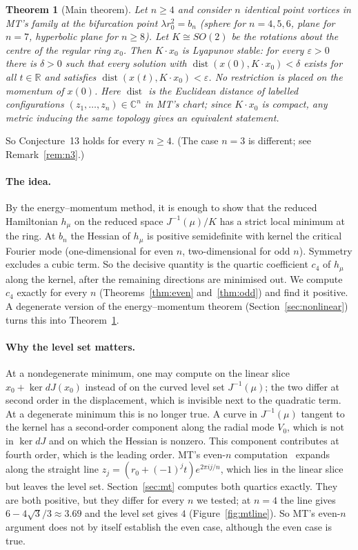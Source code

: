 \documentclass[11pt]{article}
\numberwithin{equation}{section}
\newtheorem{theorem}{Theorem}[section]
\theoremstyle{definition}
\theoremstyle{remark}
\newcommand{\R}{\mathbb{R}}
\newcommand{\C}{\mathbb{C}}
\begin{document}
\begin{theorem}[Main theorem]\label{thm:main}
Let $n\ge4$ and consider $n$ identical point vortices in MT's family at the bifurcation point
$\lambda r_0^2=b_n$ (sphere for $n=4,5,6$, plane for $n=7$, hyperbolic plane for $n\ge8$). Let $K\cong
SO(2)$ be the rotations about the centre of the regular ring $x_0$. Then $K\cdot x_0$ is Lyapunov stable:
for every $\varepsilon>0$ there is $\delta>0$ such that every solution with
$\operatorname{dist}(x(0),K\cdot x_0)<\delta$ exists for all $t\in\R$ and satisfies
$\operatorname{dist}(x(t),K\cdot x_0)<\varepsilon$. No restriction is placed on the momentum of $x(0)$.
Here $\operatorname{dist}$ is the Euclidean distance of labelled configurations $(z_1,\dots,z_n)\in\C^n$ in MT's
chart; since $K\cdot x_0$ is compact, any metric inducing the same topology gives an equivalent statement.
\end{theorem}

\noindent So Conjecture~13 holds for every $n\ge4$. (The case $n=3$ is different; see
Remark~\ref{rem:n3}.)

\paragraph{The idea.} By the energy--momentum method, it is enough to show that the reduced Hamiltonian
$h_\mu$ on the reduced space $J^{-1}(\mu)/K$ has a strict local minimum at the ring. At $b_n$ the Hessian
of $h_\mu$ is positive semidefinite with kernel the critical Fourier mode (one-dimensional for even $n$,
two-dimensional for odd $n$). Symmetry excludes a cubic term. So the decisive quantity is the quartic
coefficient $c_4$ of $h_\mu$ along the kernel, after the remaining directions are minimised out. We
compute $c_4$ exactly for every $n$ (Theorems~\ref{thm:even} and~\ref{thm:odd}) and find it positive. A
degenerate version of the energy--momentum theorem (Section~\ref{sec:nonlinear}) turns this into
Theorem~\ref{thm:main}.

\paragraph{Why the level set matters.} At a nondegenerate minimum, one may compute on the linear slice
$x_0+\ker dJ(x_0)$ instead of on the curved level set $J^{-1}(\mu)$; the two differ at second order in the
displacement, which is invisible next to the quadratic term. At a degenerate minimum this is no longer
true. A curve in $J^{-1}(\mu)$ tangent to the kernel has a second-order component along the radial mode
$V_0$, which is not in $\ker dJ$ and on which the Hessian is nonzero. This component contributes at fourth
order, which is the leading order. MT's even-$n$ computation~\cite[\S3.5.1]{MT} expands along the straight
line $z_j=(r_0+(-1)^jt)e^{2\pi ij/n}$, which lies in the linear slice but leaves the level set. Section~\ref{sec:mt}
computes both quartics exactly. They are both positive, but they differ for every $n$ we tested; at $n=4$
the line gives $6-4\sqrt3/3\approx3.69$ and the level set gives $4$ (Figure~\ref{fig:mtline}). So MT's
even-$n$ argument does not by itself establish the even case, although the even case is true.
\end{document}
